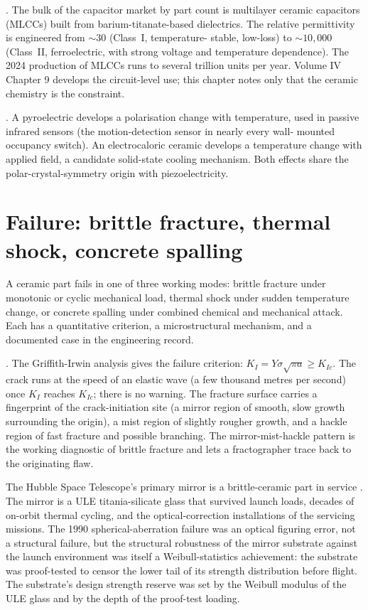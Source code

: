 . The bulk of the
capacitor market by part count is multilayer ceramic capacitors
(MLCCs) built from barium-titanate-based dielectrics. The relative
permittivity is engineered from $\sim 30$ (Class~I, temperature-
stable, low-loss) to $\sim 10{,}000$ (Class~II, ferroelectric, with
strong voltage and temperature dependence). The 2024 production of
MLCCs runs to several trillion units per year. Volume IV Chapter 9
develops the circuit-level use; this chapter notes only that the
ceramic chemistry is the constraint.

. A pyroelectric
develops a polarisation change with temperature, used in passive
infrared sensors (the motion-detection sensor in nearly every wall-
mounted occupancy switch). An electrocaloric ceramic develops a
temperature change with applied field, a candidate solid-state cooling
mechanism. Both effects share the polar-crystal-symmetry origin with
piezoelectricity.

\section{Failure: brittle fracture, thermal shock, concrete spalling}

A ceramic part fails in one of three working modes: brittle fracture
under monotonic or cyclic mechanical load, thermal shock under sudden
temperature change, or concrete spalling under combined chemical and
mechanical attack. Each has a quantitative criterion, a microstructural
mechanism, and a documented case in the engineering record.

. The Griffith-Irwin analysis
gives the failure criterion: $K_I = Y \sigma \sqrt{\pi a} \geq K_{Ic}$.
The crack runs at the speed of an elastic wave (a few thousand metres
per second) once $K_I$ reaches $K_{Ic}$; there is no warning. The
fracture surface carries a fingerprint of the crack-initiation site (a
mirror region of smooth, slow growth surrounding the origin), a mist
region of slightly rougher growth, and a hackle region of fast
fracture and possible branching. The mirror-mist-hackle pattern is the
working diagnostic of brittle fracture and lets a fractographer trace
back to the originating flaw.

The Hubble Space Telescope's primary mirror is a brittle-ceramic part
in service \cite{acc:nasa-hubble-optical-systems-1990}. The mirror is
a ULE titania-silicate glass that survived launch loads, decades of
on-orbit thermal cycling, and the optical-correction installations of
the servicing missions. The 1990 spherical-aberration failure was an
optical figuring error, not a structural failure, but the structural
robustness of the mirror substrate against the launch environment was
itself a Weibull-statistics achievement: the substrate was proof-tested
to censor the lower tail of its strength distribution before flight.
The substrate's design strength reserve was set by the Weibull modulus
of the ULE glass and by the depth of the proof-test loading.

